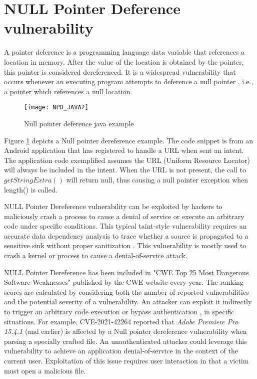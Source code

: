 \section{NULL Pointer Deference vulnerability} %
\label{sub: NULL_Pointer_Dereference}

A pointer deference \cite{ImmuniWeb2012, CVE476} is a programming language data variable that references a location in memory. After the value of the location is obtained by the pointer, this pointer is considered dereferenced. It is a widespread vulnerability that occurs whenever an executing program attempts to deference a null pointer \cite{WENHUI_JIN12021}, i.e., a pointer which references a null location. 

\begin{figure}[ht]
	\centering
	\texttt{[image: NPD\_JAVA2]}
	  \caption{Null pointer deference java example}
  \label{fig:java_npd}
\end{figure}

Figure \ref{fig:java_npd} depicts a Null pointer dereference example. The code snippet is from an Android application that has registered to handle a URL when sent an intent. The application code exemplified assumes the URL (Uniform Resource Locator) will always be included in the intent. When the URL is not present, the call to \(getStringExtra()\) will return null, thus causing a null pointer exception when length() is called.

NULL Pointer Dereference vulnerability can be exploited by hackers to maliciously crash a process to cause a denial of service or execute an arbitrary code under specific conditions. This typical taint-style vulnerability requires an accurate data dependency analysis to trace whether a source is propagated to a sensitive sink without proper sanitization \cite{WENHUI_JIN12021}. This vulnerability is mostly used to crash a kernel or process to cause a denial-of-service attack.

NULL Pointer Dereference has been included in "CWE Top 25 Most Dangerous Software Weaknesses" published by the CWE website \cite{CVE_TOP25} every year. The ranking scores are calculated by considering both the number of reported vulnerabilities and the potential severity of a vulnerability. An attacker can exploit it indirectly to trigger an arbitrary code execution or bypass authentication \cite{Pietro_Oliva2023}, in specific situations. For example, CVE-2021-42264 \cite{CVE_2021_42264} reported that \textit{Adobe Premiere Pro 15.4.1} (and earlier) is affected by a Null pointer dereference vulnerability when parsing a specially crafted file. An unauthenticated attacker could leverage this vulnerability to achieve an application denial-of-service in the context of the current user. Exploitation of this issue requires user interaction in that a victim must open a malicious file.

